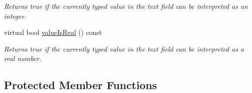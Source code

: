 \begin{DoxyCompactItemize}
\begin{DoxyCompactList}\small\item\em Returns true if the currently typed value in the text field can be interpreted as an integer. \end{DoxyCompactList}\item 
virtual bool \mbox{\hyperlink{classsgl_1_1GTextField_a29a5f540431d7993ff00eee5d2584a36}{value\+Is\+Real}} () const
\begin{DoxyCompactList}\small\item\em Returns true if the currently typed value in the text field can be interpreted as a real number. \end{DoxyCompactList}\end{DoxyCompactItemize}
\subsection*{Protected Member Functions}
